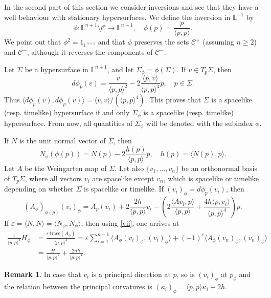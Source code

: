 \documentclass[a4paper,12pt]{amsart}
\theoremstyle{definition}
\newtheorem{remark}[theorem]{Remark}
\def\l{\mathbb L}
\begin{document}
In the second part of this section we consider inversions and see that they have a well behaviour with stationary hypersurfaces. We define the inversion in $\l^{+1}$ by
 $$\phi\colon\l^{n+1}\setminus\mathcal{C}\to\l^{n+1},\quad \phi(p)=\frac{p}{\langle p,p\rangle}.$$
 We point out that $\phi^2=1_{\l^{n+1}}$ and that $\phi$ preserves the sets $\mathcal{C}^+$ (assuming $n\geq 2$) and $\mathcal{C}^-$, although it reverses the components of $\mathcal{C}^-$.
  
 Let $\Sigma$ be a hypersurface in $\l^{n+1}$, and let $\Sigma_\phi=\phi(\Sigma)$. If $v\in T_p\Sigma$, then 
 $$d\phi_p(v)=\frac{v}{\langle p,p\rangle^2}-2\frac{\langle p,v\rangle}{\langle p,p\rangle^4}p, \quad p \in \Sigma.$$
 Thus $\langle d\phi_p(v),d\phi_p(v)\rangle=\langle v,v\rangle/(\langle p,p\rangle^4)$. This proves that  $\Sigma$ is a spacelike (resp. timelike) hypersurface if and only $\Sigma_\phi$ is a spacelike (resp. timelike) hypersurface. 
 From now, all quantities of $\Sigma_\phi$ will be denoted with the subindex $\phi$. 
 
If $N$ is the unit normal vector of $\Sigma$, then 
$$N_\phi(\phi(p))=N(p)-2\frac{h(p)}{\langle p,p\rangle}p,\quad h(p)=\langle N(p),p\rangle.$$
Let $A$ be the Weingarten map of $\Sigma$. Let also $\{v_1,\ldots,v_n\}$ be an orthonormal basis of $T_p\Sigma$, where all vectors $v_i$ are spacelike except $v_n$, which is spacelike or timelike depending on whether $\Sigma$ is spacelike or timelike. If $(v_i)_\phi=d\phi_p(v_i)$, then
\begin{equation}\label{vii}
(A_\phi)_{\phi(p)}(v_i)_\phi=A_p(v_i)+2\frac{2h}{\langle p,p\rangle}v_i-\left(2\frac{\langle Av_i,p\rangle}{\langle p,p\rangle}+\frac{4h\langle p,v_i\rangle}{\langle p,p\rangle^4}\right)p.
\end{equation}
If $\varepsilon=\langle N,N\rangle=\langle N_\phi,N_\phi\rangle$, then using \eqref{vii}, one arrives at
\begin{equation}\label{hv}
\begin{split}
\frac{1}{\langle p,p\rangle^4}H_\phi&=\frac{\varepsilon\, \mbox{trace}(A_\phi)}{\langle p,p\rangle^4}= \varepsilon\sum_{i=1}^{n-1}\langle A_\phi(v_i)_\phi,(v_i)_\phi\rangle+(-1)^\varepsilon \langle A_\phi(v_n)_\phi,(v_n)_\phi\rangle\\
&=\frac{H}{\langle p,p\rangle^2}+\frac{2nh}{\langle p,p\rangle^4}.
\end{split}
\end{equation}
\begin{remark} In case that $v_i$ is a principal direction at $p$, so is $(v_i)_\phi$ at $p_\phi$ and the relation between the principal curvatures is $(\kappa_i)_\phi=\langle p,p\rangle\kappa_i+2h$.
\end{remark}
\end{document}
